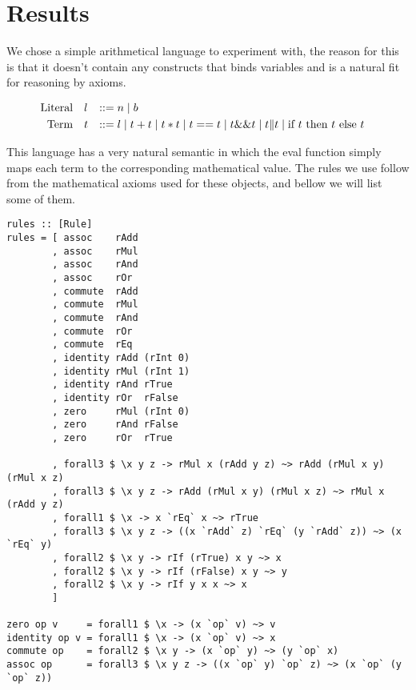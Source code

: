 
\section{Results}

We chose a simple arithmetical language to experiment with, the reason for this
is that it doesn't contain any constructs that binds variables and is a natural
fit for reasoning by axioms.


\begin{equation*}
\begin{aligned}
\text{Literal}\quad&l&::=&\;n \;|\; b&\text{} \\
\text{Term}\quad&t&::=&\;l \;|\; t + t \;|\; t * t \;|\; t == t \;|\; t \&\& t
                 \;|\; t \| t \;|\; \text{if } t \text{ then } t \text{ else } t
                 &\text{} 
\end{aligned}
\end{equation*}

This language has a very natural semantic in which the eval function simply maps
each term to the corresponding mathematical value. 
The rules we use follow from the mathematical axioms used for these objects, and
bellow we will list some of them.

\begin{verbatim}
rules :: [Rule]
rules = [ assoc    rAdd
        , assoc    rMul
        , assoc    rAnd
        , assoc    rOr
        , commute  rAdd
        , commute  rMul
        , commute  rAnd
        , commute  rOr
        , commute  rEq
        , identity rAdd (rInt 0)
        , identity rMul (rInt 1)
        , identity rAnd rTrue
        , identity rOr  rFalse
        , zero     rMul (rInt 0)
        , zero     rAnd rFalse
        , zero     rOr  rTrue

        , forall3 $ \x y z -> rMul x (rAdd y z) ~> rAdd (rMul x y) (rMul x z)
        , forall3 $ \x y z -> rAdd (rMul x y) (rMul x z) ~> rMul x (rAdd y z)
        , forall1 $ \x -> x `rEq` x ~> rTrue
        , forall3 $ \x y z -> ((x `rAdd` z) `rEq` (y `rAdd` z)) ~> (x `rEq` y)
        , forall2 $ \x y -> rIf (rTrue) x y ~> x
        , forall2 $ \x y -> rIf (rFalse) x y ~> y
        , forall2 $ \x y -> rIf y x x ~> x
        ]

zero op v     = forall1 $ \x -> (x `op` v) ~> v
identity op v = forall1 $ \x -> (x `op` v) ~> x
commute op    = forall2 $ \x y -> (x `op` y) ~> (y `op` x)
assoc op      = forall3 $ \x y z -> ((x `op` y) `op` z) ~> (x `op` (y `op` z))
\end{verbatim}

